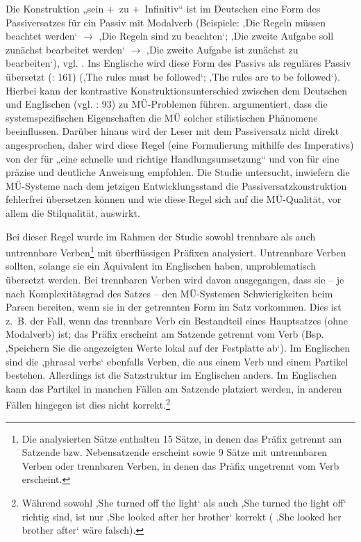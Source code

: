 Die Konstruktion „sein +~zu +~Infinitiv“ ist im Deutschen eine Form des Passiversatzes für ein Passiv mit Modalverb (Beispiele: ‚Die Regeln müssen beachtet werden‘ $\to$ ‚Die Regeln sind zu beachten‘; ‚Die zweite Aufgabe soll zunächst bearbeitet werden‘ $\to$ ‚Die zweite Aufgabe ist zunächst zu bearbeiten‘), vgl. \citet[92]{Teich2003}. Ins Englische wird diese Form des Passivs als reguläres Passiv übersetzt (\citealt{KönigGast2012}: 161) (‚The rules must be followed‘; ‚The rules are to be followed‘). Hierbei kann der kontrastive Konstruktionsunterschied zwischen dem Deutschen und Englischen (vgl. \citealt{Teich2003}: 93) zu MÜ-Problemen führen. \citet{Reuther2003} argumentiert, dass die systemspezifischen Eigenschaften die MÜ solcher stilistischen Phänomene beeinflussen. Darüber hinaus wird der Leser mit dem Passiversatz nicht direkt angesprochen, daher wird diese Regel (eine Formulierung mithilfe des Imperativs) von der \citet[28]{tekom2013} für „eine schnelle und richtige Handlungsumsetzung“ und von \citet{Congree2018} für eine präzise und deutliche Anweisung empfohlen. Die Studie untersucht, inwiefern die MÜ-Systeme nach dem jetzigen Entwicklungsstand die Passiversatzkonstruktion fehlerfrei übersetzen können und wie diese Regel sich auf die MÜ-Qualität, vor allem die Stilqualität, auswirkt.

Bei dieser Regel wurde im Rahmen der Studie sowohl trennbare als auch untrennbare Verben\footnote{{{{Die analysierten Sätze enthalten 15 Sätze, in denen das Präfix getrennt am Satzende bzw. Nebensatzende erscheint sowie 9 Sätze mit untrennbaren Verben oder trennbaren Verben, in denen das Präfix ungetrennt vom Verb erscheint.}}}} mit überflüssigen Präfixen analysiert. Untrennbare Verben sollten, solange sie ein Äquivalent im Englischen haben, unproblematisch übersetzt werden. Bei trennbaren Verben wird davon ausgegangen, dass sie -- je nach Komplexitätsgrad des Satzes -- den MÜ-Systemen Schwierigkeiten beim Parsen bereiten, wenn sie in der getrennten Form im Satz vorkommen. Dies ist z.~B. der Fall, wenn das trennbare Verb ein Bestandteil eines Hauptsatzes (ohne Modalverb) ist; das Präfix erscheint am Satzende getrennt vom Verb (Bsp. ‚Speichern Sie die angezeigten Werte lokal auf der Festplatte ab‘). Im Englischen sind die ‚phrasal verbs‘ ebenfalls Verben, die aus einem Verb und einem Partikel bestehen. Allerdings ist die Satzstruktur im Englischen anders. Im Englischen kann das Partikel in manchen Fällen am Satzende platziert werden, in anderen Fällen hingegen ist dies nicht korrekt.\footnote{{{{Während sowohl} }},{{{She turned off the light}}}\textrm{‘}{{{ als auch} }},{{{She turned the light off}}}\textrm{‘}{{{ richtig sind, ist nur} }},{{{She looked after her brother}}}\textrm{‘}{{{ korrekt (} }},{{{She looked her brother after}}}\textrm{‘}{{{ wäre falsch).}}}}

